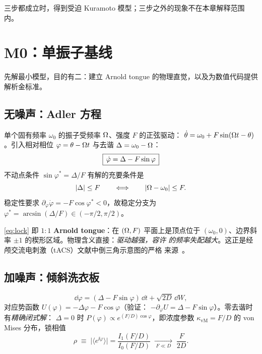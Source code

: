 三步都成立时，得到受迫 Kuramoto 模型；三步之外的现象不在本章解释范围内。

\section{M0：单振子基线}
\label{sec:M0}

先解最小模型，目的有二：建立 Arnold tongue 的物理直觉，以及为数值代码提供
解析金标准。

\subsection{无噪声：Adler 方程}

单个固有频率 $\omega_0$ 的振子受频率 $\Omega$、强度 $F$ 的正弦驱动：
$\dot\theta=\omega_0+F\sin(\Omega t-\theta)$。引入相对相位
$\varphi=\theta-\Omega t$ 与去谐 $\Delta=\omega_0-\Omega$：
%
\begin{equation}\label{eq:adler}
\boxed{\,\dot\varphi=\Delta-F\sin\varphi\,}
\end{equation}
%
不动点条件 $\sin\varphi^{*}=\Delta/F$ 有解的充要条件是
%
\begin{equation}\label{eq:lock}
|\Delta|\le F
\qquad\Longleftrightarrow\qquad
|\Omega-\omega_0|\le F .
\end{equation}
%
稳定性要求 $\partial_\varphi\dot\varphi=-F\cos\varphi^{*}<0$，故稳定分支为
$\varphi^{*}=\arcsin(\Delta/F)\in(-\pi/2,\pi/2)$。

\cref{eq:lock} 即 $1{:}1$ \textbf{Arnold tongue}：在 $(\Omega,F)$ 平面上是顶点位于
$(\omega_0,0)$、边界斜率 $\pm1$ 的楔形区域。物理含义直接：\emph{驱动越强，容许
的频率失配越大}。这正是经颅交流电刺激（tACS）文献中倒三角示意图的严格
来源~\citep{Ali2013,Notbohm2016}。

\subsection{加噪声：倾斜洗衣板}

\begin{equation}\label{eq:sde}
\dd\varphi=(\Delta-F\sin\varphi)\,\dd t+\sqrt{2D}\,\dd W ,
\end{equation}
%
对应势函数 $U(\varphi)=-\Delta\varphi-F\cos\varphi$（验证：
$-\partial_\varphi U=\Delta-F\sin\varphi$）。零去谐时有\emph{精确闭式解}：
$\Delta=0$ 时 $P(\varphi)\propto e^{(F/D)\cos\varphi}$，即浓度参数
$\kappa_{\mathrm{vM}}=F/D$ 的 von Mises 分布，锁相值
%
\begin{equation}\label{eq:vonmises}
\rho\;\equiv\;\bigl|\langle e^{\ii\varphi}\rangle\bigr|
=\frac{I_1(F/D)}{I_0(F/D)}
\;\xrightarrow[\;F\ll D\;]{}\;\frac{F}{2D}.
\end{equation}

